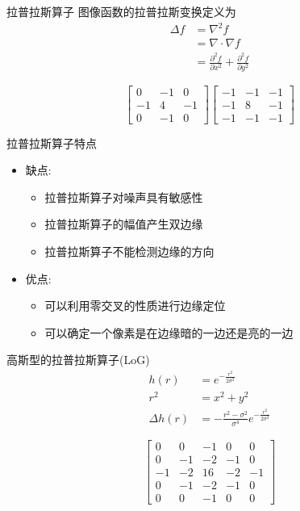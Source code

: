 \documentclass[presentation]{beamer}
\begin{document}
\begin{frame}[label={sec:orgbeffddb}]{拉普拉斯算子}
图像函数的拉普拉斯变换定义为
\begin{align*}
\Delta f &=\nabla^2 f \\
         &= \nabla\cdot\nabla f\\ 
         &=\frac{\partial^2 f}{\partial x^2} +\frac{\partial^2 f}{\partial y^2} 
\end{align*}

\[\begin{bmatrix}
            0 & -1 &  0 \\
           -1 &  4 &  -1 \\
            0 & -1 &  0 \end{bmatrix}
           \begin{bmatrix}
           -1 &  -1 &  -1 \\
           -1 &  8  &  -1 \\
           -1 &  -1 &  -1 \end{bmatrix}\]
\end{frame}

\begin{frame}[label={sec:orgc07b948}]{拉普拉斯算子特点}
\begin{itemize}
\item 缺点:
\begin{itemize}
\item 拉普拉斯算子对噪声具有敏感性
\item 拉普拉斯算子的幅值产生双边缘
\item 拉普拉斯算子不能检测边缘的方向
\end{itemize}
\item 优点:
\begin{itemize}
\item 可以利用零交叉的性质进行边缘定位
\item 可以确定一个像素是在边缘暗的一边还是亮的一边
\end{itemize}
\end{itemize}
\end{frame}

\begin{frame}[label={sec:orgc5ca22d}]{高斯型的拉普拉斯算子(LoG)}
\begin{align*}
h(r) &= e^{-\frac{r^2}{2\sigma^2}} \\
r^2 &= x^2+y^2\\
\Delta h(r) &=-\frac{r^2-\sigma^2}{\sigma^4}e^{-\frac{r^2}{2\sigma^2}}
\end{align*}

\[ \begin{bmatrix}
     0 &  0 & -1 &  0 &  0 \\
     0 & -1 & -2 & -1 &  0 \\
    -1 & -2 & 16 & -2 & -1 \\
     0 & -1 & -2 & -1 &  0 \\
     0 &  0 & -1 &  0 &  0 \end{bmatrix}\]
\end{frame}
\end{document}
